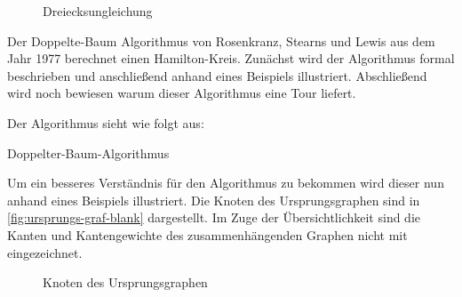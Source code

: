\documentclass{article}
\begin{document}
\begin{figure}[H]
\centering
{}
\caption{Dreiecksungleichung}
\label{fig:dreiecksungleichung}
\end{figure}

Der Doppelte-Baum Algorithmus von Rosenkranz, Stearns und Lewis aus dem Jahr 1977 berechnet einen Hamilton-Kreis. Zunächst wird der Algorithmus formal beschrieben und anschließend anhand eines Beispiels illustriert. Abschließend wird noch bewiesen warum dieser Algorithmus eine Tour liefert.

Der Algorithmus sieht wie folgt aus:

\begin{algorithm}
\caption{Doppelter-Baum-Algorithmus}
\end{algorithm}

Um ein besseres Verständnis für den Algorithmus zu bekommen wird dieser nun anhand eines Beispiels illustriert. Die Knoten des Ursprungsgraphen sind in \autoref{fig:ursprungs-graf-blank} dargestellt. Im Zuge der Übersichtlichkeit sind die Kanten und Kantengewichte des zusammenhängenden Graphen nicht mit eingezeichnet.

\begin{figure}[H]
\centering
{}
\caption{Knoten des Ursprungsgraphen}
\label{fig:ursprungs-graf-blank}
\end{figure}
\end{document}
